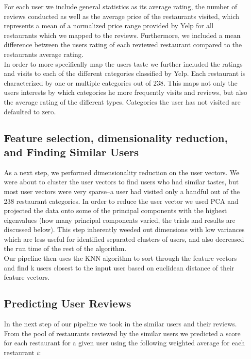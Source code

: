 \documentclass[10pt,twocolumn,letterpaper]{article}
\begin{document}
For each user we include general statistics as its average rating, the number of reviews conducted as well as the average price of the restaurants visited, which represents a mean of a normalized price range provided by Yelp for all restaurants which we mapped to the reviews. Furthermore, we included a mean difference between the users rating of each reviewed restaurant compared to the restaurants average rating. 
\\[.5em]
\indent In order to more specifically map the users taste we further included the ratings and visits to each of the different categories classified by Yelp. Each restaurant is characterized by one or multiple categories out of 238. This maps not only the users interests by which categories he more frequently visits and reviews, but also the average rating of the different types. Categories the user has not visited are defaulted to zero.

\subsection{Feature selection, dimensionality reduction, and Finding Similar Users}
As a next step, we performed dimensionality reduction on the user vectors. We were about to cluster the user vectors to find users who had similar tastes, but most user vectors were very sparse--a user had visited only a handful out of the 238 restaurant categories. In order to reduce the user vector we used PCA and projected the data onto some of the principal components with the highest eigenvalues (how many principal components varied, the trials and results are discussed below). This step inherently weeded out dimensions with low variances which are less useful for identified separated clusters of users, and also decreased the run time of the rest of the algorithm.\\
\indent Our pipeline then uses the KNN algorithm to sort through the feature vectors and find k users closest to the input user based on euclidean distance of their feature vectors. 

\subsection{Predicting User Reviews}
In the next step of our pipeline we took in the similar users and their reviews. From the pool of restaurants reviewed by the similar users we predicted a score for each restaurant for a given user using the following weighted average for each restaurant $i$:
\end{document}
